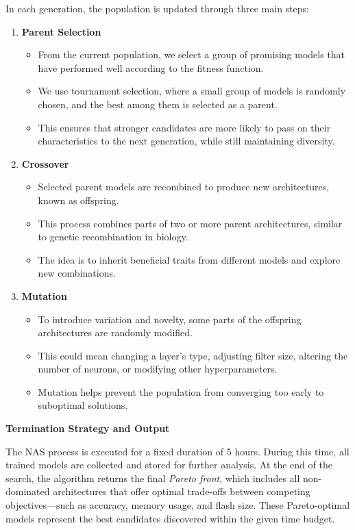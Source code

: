 In each generation, the population is updated through three main steps:
\begin{enumerate}
    \item \textbf{Parent Selection}
    \begin{itemize}
        \item From the current population, we select a group of promising models that have performed well according to the fitness function.
        \item We use tournament selection, where a small group of models is randomly chosen, and the best among them is selected as a parent.
        \item This ensures that stronger candidates are more likely to pass on their characteristics to the next generation, while still maintaining diversity.
    \end{itemize}
    \item \textbf{Crossover}
    \begin{itemize}
        \item Selected parent models are recombined to produce new architectures, known as offspring.
        \item This process combines parts of two or more parent architectures, similar to genetic recombination in biology.
        \item The idea is to inherit beneficial traits from different models and explore new combinations.


    \end{itemize}
    \item \textbf{Mutation}
    \begin{itemize}
        \item To introduce variation and novelty, some parts of the offspring architectures are randomly modified.
        \item This could mean changing a layer’s type, adjusting filter size, altering the number of neurons, or modifying other hyperparameters.
        \item Mutation helps prevent the population from converging too early to suboptimal solutions.


    \end{itemize}
\end{enumerate}
  
\textbf{Termination Strategy and Output}

The NAS process is executed for a fixed duration of 5 hours. During this time, all trained models are collected and stored for further analysis. At the end of the search, the algorithm returns the final \textit{Pareto front}, which includes all non-dominated architectures that offer optimal trade-offs between competing objectives—such as accuracy, memory usage, and flash size. These Pareto-optimal models represent the best candidates discovered within the given time budget.

